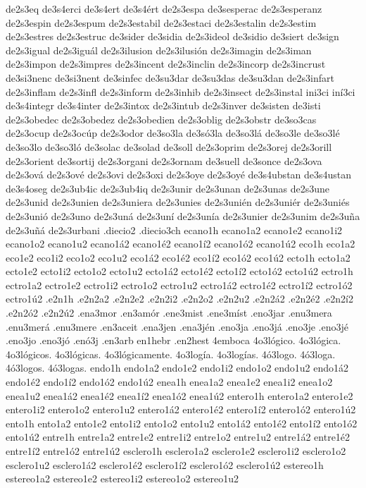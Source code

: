 {de2s3eq
de3s4erci
de3s4ert
de3s4ért
de2s3espa
de3sesperac
de2s3esperanz
de2s3espin
de2s3espum
de2s3estabil
de2s3estaci
de2s3estalin
de2s3estim
de2s3estres
de2s3estruc
de3sider
de3sidia
de2s3ideol
de3sidio
de3siert
de3sign
de2s3igual
de2s3iguál
de2s3ilusion
de2s3ilusión
de2s3imagin
de2s3iman
de2s3impon
de2s3impres
de2s3incent
de2s3inclin
de2s3incorp
de2s3incrust
de3si3nenc
de3si3nent
de3sinfec
de3su3dar
de3su3das
de3su3dan
de2s3infart
de2s3inflam
de2s3infl
de2s3inform
de2s3inhib
de2s3insect
de2s3instal
ini3ci
iní3ci
de3s4integr
de3s4inter
de2s3intox
de2s3intub
de2s3inver
de3sisten
de3isti
de2s3obedec
de2s3obedez
de2s3obedien
de2s3oblig
de2s3obstr
de3so3cas
de2s3ocup
de2s3ocúp
de2s3odor
de3so3la
de3só3la
de3so3lá
de3so3le
de3so3lé
de3so3lo
de3so3ló
de3solac
de3solad
de3soll
de2s3oprim
de2s3orej
de2s3orill
de2s3orient
de3sortij
de2s3organi
de2s3ornam
de3suell
de3sonce
de2s3ova
de2s3ová
de2s3ové
de2s3ovi
de2s3oxi
de2s3oye
de2s3oyé
de3s4ubstan
de3s4ustan
de3s4oseg
de2s3ub4ic
de2s3ub4iq
de2s3unir
de2s3unan
de2s3unas
de2s3une
de2s3unid
de2s3unien
de2s3uniera
de2s3unies
de2s3unién
de2s3uniér
de2s3uniés
de2s3unió
de2s3uno
de2s3uná
de2s3uní
de2s3unía
de2s3unier
de2s3unim
de2s3uña
de2s3uñá
de2s3urbani
.diecio2
.diecio3ch
ecano1h
ecano1a2 ecano1e2 ecano1i2 ecano1o2 ecano1u2
ecano1á2 ecano1é2 ecano1í2 ecano1ó2 ecano1ú2
eco1h
eco1a2 eco1e2 eco1i2 eco1o2 eco1u2
eco1á2 eco1é2 eco1í2 eco1ó2 eco1ú2
ecto1h
ecto1a2 ecto1e2 ecto1i2 ecto1o2 ecto1u2
ecto1á2 ecto1é2 ecto1í2 ecto1ó2 ecto1ú2
ectro1h
ectro1a2 ectro1e2 ectro1i2 ectro1o2 ectro1u2
ectro1á2 ectro1é2 ectro1í2 ectro1ó2 ectro1ú2
.e2n1h
.e2n2a2 .e2n2e2 .e2n2i2 .e2n2o2 .e2n2u2
.e2n2á2 .e2n2é2 .e2n2í2 .e2n2ó2 .e2n2ú2
.ena3mor
.en3amór
.ene3mist
.ene3míst
.eno3jar
.enu3mera
.enu3merá
.enu3mere
.en3aceit
.ena3jen
.ena3jén
.eno3ja
.eno3já
.eno3je
.eno3jé
.eno3jo
.eno3jó
.enó3j
.en3arb
en1hebr
.en2hest
4emboca
4o3lógico.
4o3lógica.
4o3lógicos.
4o3lógicas.
4o3lógicamente.
4o3logía.
4o3logías.
4ó3logo.
4ó3loga.
4ó3logos.
4ó3logas.
endo1h
endo1a2 endo1e2 endo1i2 endo1o2 endo1u2
endo1á2 endo1é2 endo1í2 endo1ó2 endo1ú2
enea1h
enea1a2 enea1e2 enea1i2 enea1o2 enea1u2
enea1á2 enea1é2 enea1í2 enea1ó2 enea1ú2
entero1h
entero1a2 entero1e2 entero1i2 entero1o2 entero1u2
entero1á2 entero1é2 entero1í2 entero1ó2 entero1ú2
ento1h
ento1a2 ento1e2 ento1i2 ento1o2 ento1u2
ento1á2 ento1é2 ento1í2 ento1ó2 ento1ú2
entre1h
entre1a2 entre1e2 entre1i2 entre1o2 entre1u2
entre1á2 entre1é2 entre1í2 entre1ó2 entre1ú2
esclero1h
esclero1a2 esclero1e2 esclero1i2 esclero1o2 esclero1u2
esclero1á2 esclero1é2 esclero1í2 esclero1ó2 esclero1ú2
estereo1h
estereo1a2 estereo1e2 estereo1i2 estereo1o2 estereo1u2
}
